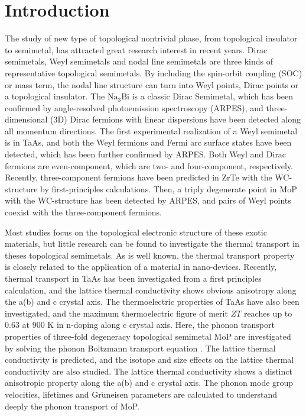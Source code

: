 \documentclass[twocolumn,showkeys,aps,prb,showpacs]{revtex4-1}
\begin{document}
\section{Introduction}
The study of  new type of topological nontrivial phase, from topological insulator to semimetal,
has attracted great research interest in recent years\cite{q1,q2,q3,q4,q5,q5-1,q6,q7,q8}.
Dirac semimetals, Weyl semimetals and nodal line semimetals are three kinds of  representative topological semimetals\cite{q4,q5,q8}.  By including
the spin-orbit coupling (SOC) or mass term, the nodal line structure can
turn into Weyl points,  Dirac points  or  a topological insulator\cite{q9}.  The $\mathrm{Na_3Bi}$ is a classic  Dirac Semimetal, which has been confirmed by angle-resolved photoemission spectroscopy (ARPES), and three-dimensional (3D) Dirac fermions with linear dispersions have been detected  along all momentum directions\cite{q5-1}. The first experimental realization
of a Weyl semimetal is in TaAs, and both the Weyl fermions
and Fermi arc surface states have been detected\cite{q4}, which has been further confirmed by  ARPES\cite{q10}.
Both Weyl  and Dirac fermions are even-component, which are  two- and four-component, respectively. Recently, three-component fermions have been  predicted  in ZrTe with the WC-structure   by first-principles calculations\cite{q11}.  Then, a triply degenerate point in  MoP with the WC-structure  has been detected by ARPES, and pairs of Weyl points  coexist with the three-component fermions\cite{q7}.

Most studies  focus on the topological electronic
structure of these exotic materials, but little research can be found  to investigate the thermal transport in
theses topological semimetals. As is
well known,   the thermal transport property is closely related to the application of a material in nano-devices. Recently,
thermal transport in TaAs has been investigated from a first principles calculation, and the lattice thermal conductivity  shows  obvious anisotropy
along the a(b) and c crystal axis\cite{q12}. The thermoelectric properties of  TaAs have also been investigated, and the maximum thermoelectric figure of merit $ZT$ reaches  up to 0.63 at 900 K in n-doping along  c crystal axis\cite{q13}. Here,  the phonon transport properties of three-fold degeneracy topological semimetal MoP are investigated by solving the phonon Boltzmann transport equation
. The lattice thermal conductivity is predicted, and the isotope and size effects on the lattice thermal conductivity are also studied.
The lattice thermal conductivity shows a distinct anisotropic  property along the a(b) and c crystal axis.
The phonon mode group  velocities, lifetimes and  Gr$\mathrm{\ddot{u}}$neisen parameters
are calculated to understand deeply  the phonon transport  of MoP.
\end{document}
